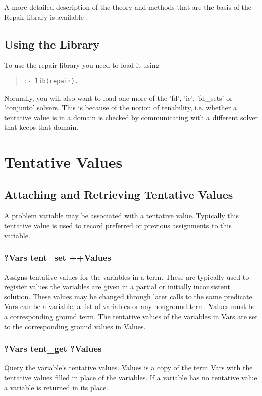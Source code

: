 A more detailed description of the theory and methods that are the basis of 
the Repair library is available \cite{HaniThesis}.


\subsection{Using the Library}
To use the repair library you need to load it using
\begin{quote}\begin{verbatim}
:- lib(repair).
\end{verbatim}\end{quote}
Normally, you will also want to load one more of the
'fd', 'ic', 'fd_sets' or 'conjunto' solvers. This is
because of the notion of tenability, i.e. whether a tentative value is
in a domain is checked by communicating with a different solver that
keeps that domain.


\section{Tentative Values}

\subsection{Attaching and Retrieving Tentative Values}
A problem variable may be associated with a tentative value.
Typically this tentative value is used to record preferred or 
previous assignments to this variable.

\subsubsection{?Vars tent_set ++Values}
\label{tentset}
Assigns tentative values for the variables in a term.  These are
typically used to register values the variables are given in a partial
or initially inconsistent solution.  These values may be changed
through later calls to the same predicate.  Vars can be a variable, a
list of variables or any nonground term.  Values must be a
corresponding ground term.  The tentative values of the variables in
Vars are set to the corresponding ground values in Values.

\subsubsection{?Vars tent_get ?Values}
Query the variable's tentative values.
Values is a copy of the term Vars with the tentative values filled in
place of the variables.   If a variable has no tentative value 
a variable is returned in its place.


